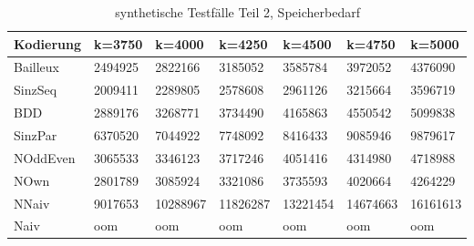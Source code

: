 \documentclass[a4,abstract=on]{scrartcl}
\begin{document}
\begin{landscape}
\begin{adjustwidth*}{-4cm}{-3cm}
\begin{flushleft}
\begin{table}[h!]
    \small
    \setlength{\tabcolsep}{0.11cm}
     \centering
     \begin{tabular}[width=\textwidth]{|l|l|l|l|l|l|l|}
	\hline
       \textbf{Kodierung} &\textbf{k=3750} &\textbf{k=4000} &\textbf{k=4250} &\textbf{k=4500} &\textbf{k=4750} &\textbf{k=5000}\\
\hline
 Bailleux & 2494925 & 2822166 & 3185052 & 3585784 & 3972052 & 4376090\\
\hline
SinzSeq  & 2009411 & 2289805 & 2578608 & 2961126 & 3215664 & 3596719\\
\hline
BDD & 2889176 & 3268771 & 3734490 & 4165863 & 4550542 & 5099838\\
\hline
SinzPar & 6370520 & 7044922 & 7748092 & 8416433 & 9085946 & 9879617\\
\hline
NOddEven & 3065533 & 3346123 & 3717246 & 4051416 & 4314980 & 4718988\\
\hline
NOwn  & 2801789 & 3085924 & 3321086 & 3735593 & 4020664 & 4264229\\
\hline
NNaiv & 9017653 & 10288967 & 11826287 & 13221454 & 14674663 & 16161613\\
\hline
Naiv  & oom & oom & oom & oom & oom & oom\\
\hline

 \end{tabular}

     \caption{synthetische Testfälle Teil 2, Speicherbedarf}
     \label{tbl:beispieltabelle}

   \end{table}
	\end{flushleft}
\end{adjustwidth*}

\end{landscape}	
\end{document}
